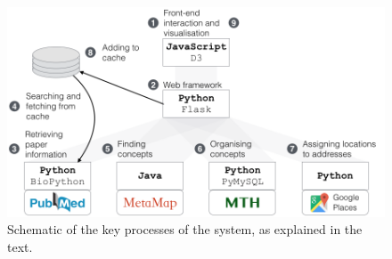 \documentclass[Report.tex]{subfiles}
\begin{document}
\begin{figure}[!h]
	\includegraphics[width=\textwidth]{../lib/images/flow.png}
	\caption{Schematic of the key processes of the system, as explained in the text.}
\label{fig:flow}
\end{figure}
\end{document}
